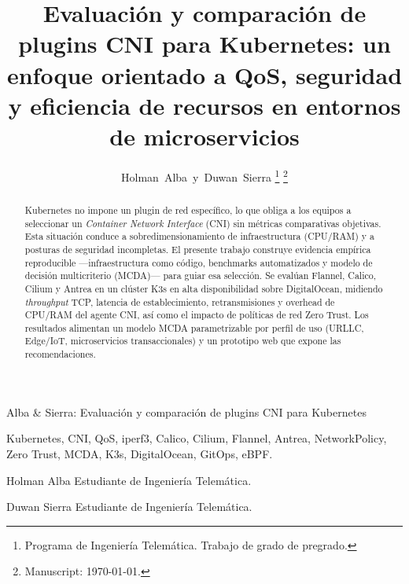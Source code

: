 \documentclass[journal]{IEEEtran}
\begin{document}
\title{Evaluación y comparación de plugins CNI para Kubernetes:
       un enfoque orientado a QoS, seguridad y eficiencia de
       recursos en entornos de microservicios}

\author{Holman~Alba~y~Duwan~Sierra%
\thanks{Programa de Ingeniería Telemática.
Trabajo de grado de pregrado.}%
\thanks{Manuscript: \today.}}

%
{Alba \& Sierra: Evaluación y comparación de plugins CNI para Kubernetes}

\maketitle

\begin{abstract}
Kubernetes no impone un plugin de red específico, lo que obliga a los
equipos a seleccionar un \emph{Container Network Interface} (CNI) sin
métricas comparativas objetivas. Esta situación conduce a
sobredimensionamiento de infraestructura (CPU/RAM) y a posturas de
seguridad incompletas. El presente trabajo construye evidencia empírica
reproducible —infraestructura como código, benchmarks automatizados y
modelo de decisión multicriterio (MCDA)— para guiar esa selección.
Se evalúan Flannel, Calico, Cilium y Antrea en un clúster K3s en alta
disponibilidad sobre DigitalOcean, midiendo \emph{throughput} TCP,
latencia de establecimiento, retransmisiones y overhead de CPU/RAM del
agente CNI, así como el impacto de políticas de red Zero Trust.
Los resultados alimentan un modelo MCDA parametrizable por perfil de
uso (URLLC, Edge/IoT, microservicios transaccionales) y un prototipo
web que expone las recomendaciones.
\end{abstract}

\begin{IEEEkeywords}
Kubernetes, CNI, QoS, iperf3, Calico, Cilium, Flannel, Antrea,
NetworkPolicy, Zero Trust, MCDA, K3s, DigitalOcean, GitOps, eBPF.
\end{IEEEkeywords}

\IEEEpeerreviewmaketitle










\begin{IEEEbiographynophoto}{Holman Alba}
Estudiante de Ingeniería Telemática.
\end{IEEEbiographynophoto}

\begin{IEEEbiographynophoto}{Duwan Sierra}
Estudiante de Ingeniería Telemática.
\end{IEEEbiographynophoto}
\end{document}
